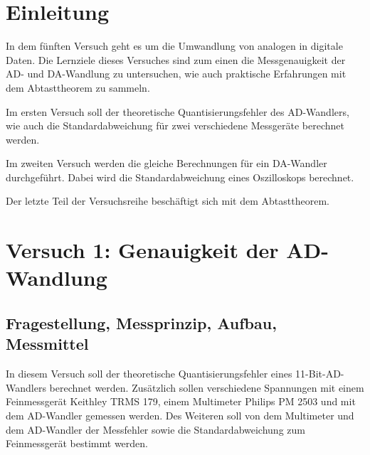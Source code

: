 \documentclass[12pt, oneside, a4paper, \docLanguage]{report}
\begin{document}

\setcounter{section}{0}



\clearpage

%
%


%
%


%
%


%
%




\setcounter{page}{1}
\pagestyle{default}
%
%
\chapter{Einleitung}
\label{chap:EINL}


In dem fünften Versuch geht es um die Umwandlung von analogen in digitale Daten. Die Lernziele dieses Versuches sind zum einen die Messgenauigkeit der AD- und DA-Wandlung zu untersuchen, wie auch praktische Erfahrungen mit dem Abtasttheorem zu sammeln.

Im ersten Versuch soll der theoretische Quantisierungsfehler des AD-Wandlers, wie auch die Standardabweichung für zwei verschiedene Messgeräte berechnet werden.

Im zweiten Versuch werden die gleiche Berechnungen für ein DA-Wandler durchgeführt. Dabei wird die Standardabweichung eines Oszilloskops berechnet.

Der letzte Teil der Versuchsreihe beschäftigt sich mit dem Abtasttheorem.

%
%
\chapter{Versuch 1: Genauigkeit der AD-Wandlung}
\label{chap:VERSUCH_1}

\section{Fragestellung, Messprinzip, Aufbau, Messmittel}
\label{chap:VERSUCH_1_FRAGESTELLUNG}
In diesem Versuch soll der theoretische Quantisierungsfehler eines 11-Bit-AD-Wandlers berechnet werden. Zusätzlich sollen verschiedene Spannungen mit einem Feinmessgerät Keithley TRMS 179, einem Multimeter Philips PM 2503 und mit dem AD-Wandler gemessen werden. Des Weiteren soll von dem Multimeter und dem AD-Wandler der Messfehler sowie die Standardabweichung zum Feinmessgerät bestimmt werden.
\end{document}
